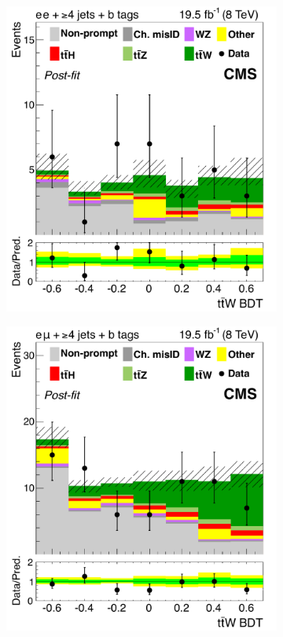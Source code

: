 \begin{figure}[tb]
\begin{subfigure}{0.33\textwidth}
    \caption{}
    \label{sfig:8-ttW-tr}
  \end{subfigure}
  \begin{subfigure}{0.33\textwidth}
    \includegraphics[width=\textwidth]{figures/eight-TeV/mva/ele_ele_ge4j_bloose_FinalBDT}
    \caption{}
    \label{sfig:8-ttW-cr}
  \end{subfigure}%
  \begin{subfigure}{0.33\textwidth}
    \includegraphics[width=\textwidth]{figures/eight-TeV/mva/mu_ele_ge4j_bloose_FinalBDT}

\end{subfigure}
\end{figure}
